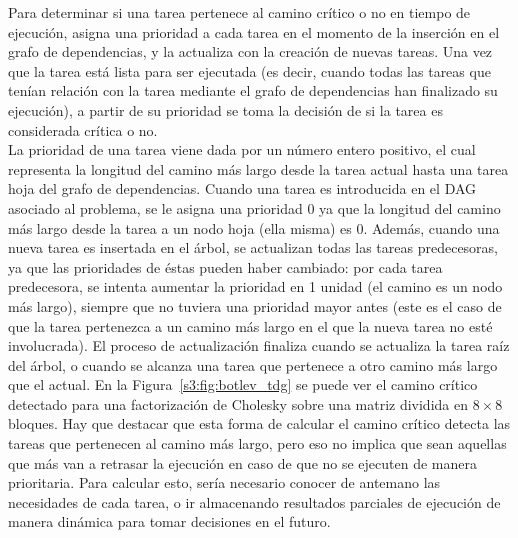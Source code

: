 Para determinar si una tarea pertenece al camino crítico o no en tiempo de
ejecución, \botlev asigna una prioridad a cada tarea en el momento de la
inserción en el grafo de dependencias, y la actualiza con la creación de
nuevas tareas. Una vez que la tarea está lista para ser ejecutada (es
decir, cuando todas las tareas que tenían relación con la tarea mediante el
grafo de dependencias han finalizado su ejecución), a partir de su
prioridad se toma la decisión de si la tarea es considerada crítica o no.\\
La prioridad de una tarea viene dada por un número entero positivo, el cual
representa la longitud del camino más largo desde la tarea actual hasta una
tarea hoja del grafo de dependencias. Cuando una tarea es introducida en el
DAG asociado al problema, se le asigna una prioridad 0 ya que la longitud
del camino más largo desde la tarea a un nodo hoja (ella misma) es
0. Además, cuando una nueva tarea es insertada en el árbol, se actualizan
todas las tareas predecesoras, ya que las prioridades de éstas pueden haber
cambiado: por cada tarea predecesora, se intenta aumentar la prioridad en 1
unidad (el camino es un nodo más largo), siempre que no tuviera una
prioridad mayor antes (este es el caso de que la tarea pertenezca a un
camino más largo en el que la nueva tarea no esté involucrada). El proceso
de actualización finaliza cuando se actualiza la tarea raíz del árbol, o
cuando se alcanza una tarea que pertenece a otro camino más largo que el
actual. En la Figura~\ref{s3:fig:botlev_tdg} se puede ver el camino crítico
detectado para una factorización de Cholesky sobre una matriz dividida en
$8\times8$ bloques. Hay que destacar que esta forma de calcular el camino
crítico detecta las tareas que pertenecen al camino más largo, pero eso no
implica que sean aquellas que más van a retrasar la ejecución en caso de
que no se ejecuten de manera prioritaria. Para calcular esto, sería
necesario conocer de antemano las necesidades de cada tarea, o ir
almacenando resultados parciales de ejecución de manera dinámica para tomar
decisiones en el futuro.

